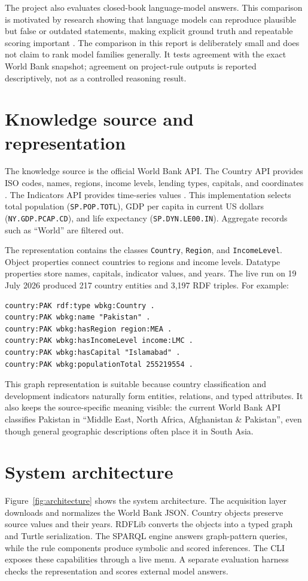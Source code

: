 \documentclass[12pt,a4paper]{article}
\begin{document}
The project also evaluates closed-book language-model answers. This comparison is motivated by research showing that language models can reproduce plausible but false or outdated statements, making explicit ground truth and repeatable scoring important \citep{lin2022truthfulqa}. The comparison in this report is deliberately small and does not claim to rank model families generally. It tests agreement with the exact World Bank snapshot; agreement on project-rule outputs is reported descriptively, not as a controlled reasoning result.

\section*{Knowledge source and representation}
The knowledge source is the official World Bank API. The Country API provides ISO codes, names, regions, income levels, lending types, capitals, and coordinates \citep{worldbankcountryapi}. The Indicators API provides time-series values \citep{worldbankindicatorsapi}. This implementation selects total population (\texttt{SP.POP.TOTL}), GDP per capita in current US dollars (\texttt{NY.GDP.PCAP.CD}), and life expectancy (\texttt{SP.DYN.LE00.IN}). Aggregate records such as ``World'' are filtered out.

The representation contains the classes \texttt{Country}, \texttt{Region}, and \texttt{IncomeLevel}. Object properties connect countries to regions and income levels. Datatype properties store names, capitals, indicator values, and years. The live run on 19 July 2026 produced 217 country entities and 3,197 RDF triples. For example:

\begin{lstlisting}
country:PAK rdf:type wbkg:Country .
country:PAK wbkg:name "Pakistan" .
country:PAK wbkg:hasRegion region:MEA .
country:PAK wbkg:hasIncomeLevel income:LMC .
country:PAK wbkg:hasCapital "Islamabad" .
country:PAK wbkg:populationTotal 255219554 .
\end{lstlisting}

This graph representation is suitable because country classification and development indicators naturally form entities, relations, and typed attributes. It also keeps the source-specific meaning visible: the current World Bank API classifies Pakistan in ``Middle East, North Africa, Afghanistan \& Pakistan'', even though general geographic descriptions often place it in South Asia.

\section*{System architecture}
Figure~\ref{fig:architecture} shows the system architecture. The acquisition layer downloads and normalizes the World Bank JSON. Country objects preserve source values and their years. RDFLib converts the objects into a typed graph and Turtle serialization. The SPARQL engine answers graph-pattern queries, while the rule components produce symbolic and scored inferences. The CLI exposes these capabilities through a live menu. A separate evaluation harness checks the representation and scores external model answers.
\end{document}
